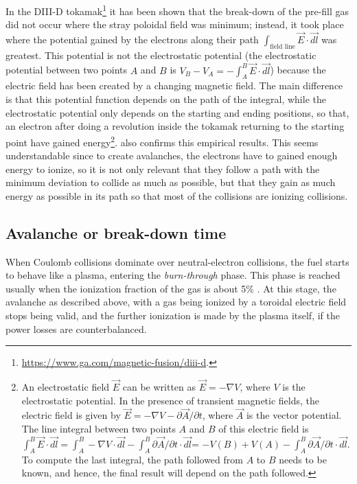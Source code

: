 \documentclass[a4paper,12pt,oneside]{book}
\newcommand{\p}{\partial}
\begin{document}
In the DIII-D tokamak\footnote{\url{https://www.ga.com/magnetic-fusion/diii-d}.} it has been shown \cite{Lazarus_1998} that the break-down of the pre-fill gas did not occur where the stray poloidal field was minimum; instead, it took place where the potential gained by the electrons along their path $\int_\text{field line} \vec{E} \cdot \vec{dl}$ was greatest. This potential is not the electrostatic potential (the electrostatic potential between two points $A$ and $B$ is $V_B-V_A=- \int_A^B \vec{E} \cdot \vec{dl}$) because the electric field has been created by a changing magnetic field. The main difference is that this potential function depends on the path of the integral, while the electrostatic potential only depends on the starting and ending positions, so that, an electron after doing a revolution inside the tokamak returning to the starting point have gained energy\footnote{An electrostatic field $\vec{E}$ can be written as  $\vec{E}=-\nabla V$, where $V$ is the electrostatic potential. In the presence of transient magnetic fields, the electric field is given by $\vec{E}=-\nabla V- \p \vec{A}/ \p t$, where $\vec{A}$ is the vector potential. The line integral between two points $A$ and $B$ of this electric field is
$\int_A^B \vec{E} \cdot \vec{dl}=\int_A^B -\nabla V \cdot \vec{dl} -\int_A^B \p \vec{A}/ \p t \cdot \vec{dl}$= $-V(B)+V(A)-\int_A^B \p \vec{A}/ \p t \cdot \vec{dl}$. To compute the last integral, the path followed from $A$ to $B$ needs to be known, and hence, the final result will depend on the path followed.}. \cite{NSTX_2017} also confirms this empirical results. This seems understandable since to create avalanches, the electrons have to gained enough energy to ionize, so it is not only relevant that they follow a path with the minimum deviation to collide as much as possible, but that they gain as much energy as possible in its path so that most of the collisions are ionizing collisions.



\subsection{Avalanche or break-down time}

When Coulomb collisions dominate over neutral-electron collisions, the fuel starts to behave like a plasma, entering the \textit{burn-through} phase. This phase is reached usually when the ionization fraction of the gas is about 5\% \cite{ITER_2019}. At this stage, the avalanche as described above, with a gas being ionized by a toroidal electric field stops being valid, and the further ionization is made by the plasma itself, if the power losses are counterbalanced. 
\end{document}
